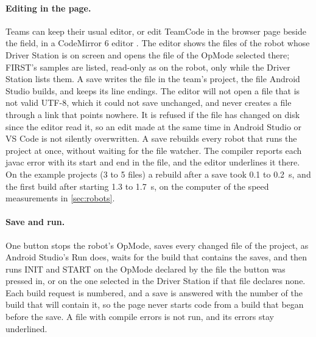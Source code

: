 \documentclass[10pt,twocolumn,letterpaper]{article}
\begin{document}
\paragraph{Editing in the page.} Teams can keep their usual editor, or edit TeamCode in the browser page beside the field, in a CodeMirror 6 editor \citep{haverbeke2026codemirror}. The editor shows the files of the robot whose Driver Station is on screen and opens the file of the OpMode selected there; FIRST's samples are listed, read-only as on the robot, only while the Driver Station lists them. A save writes the file in the team's project, the file Android Studio builds, and keeps its line endings. The editor will not open a file that is not valid UTF-8, which it could not save unchanged, and never creates a file through a link that points nowhere. It is refused if the file has changed on disk since the editor read it, so an edit made at the same time in Android Studio or VS Code is not silently overwritten. A save rebuilds every robot that runs the project at once, without waiting for the file watcher. The compiler reports each javac error with its start and end in the file, and the editor underlines it there. On the example projects (3 to 5 files) a rebuild after a save took 0.1 to 0.2~s, and the first build after starting 1.3 to 1.7~s, on the computer of the speed measurements in \cref{sec:robots}.

\paragraph{Save and run.} One button stops the robot's OpMode, saves every changed file of the project, as Android Studio's Run does, waits for the build that contains the saves, and then runs INIT and START on the OpMode declared by the file the button was pressed in, or on the one selected in the Driver Station if that file declares none. Each build request is numbered, and a save is answered with the number of the build that will contain it, so the page never starts code from a build that began before the save. A file with compile errors is not run, and its errors stay underlined.
\end{document}
